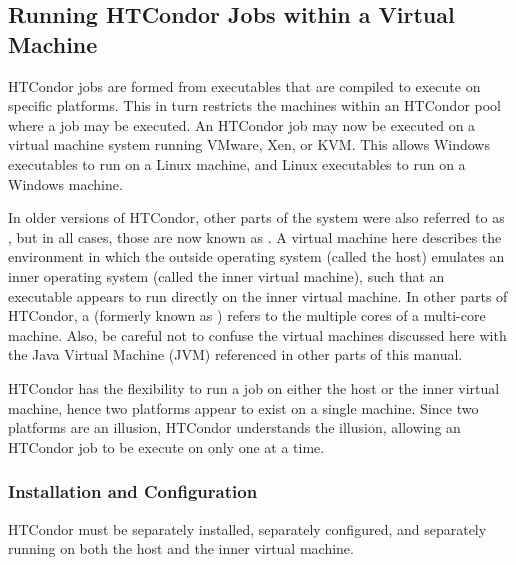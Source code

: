 \subsection{\label{sec:Virtual-Machines}
Running HTCondor Jobs within a Virtual Machine}

HTCondor jobs are formed from executables that are compiled to execute
on specific platforms.
This in turn restricts the machines within an HTCondor pool where
a job may be executed.
An HTCondor job may now be executed on a 
virtual machine system running VMware, Xen, or KVM.
This allows Windows executables to run on a Linux machine,
and Linux executables to run on a Windows machine.

In older versions of HTCondor, other parts of the system were also
referred to as , but in all cases, those are now
known as .
A virtual machine here describes the environment in which
the outside operating system (called the host) emulates an inner operating
system (called the inner virtual machine),
such that an executable appears to run directly
on the inner virtual machine.
In other parts of HTCondor, a  (formerly known as
) refers to the multiple cores of a multi-core
machine.
Also, be careful not to confuse the virtual machines discussed here
with the Java Virtual Machine (JVM) referenced in other parts of this
manual.

HTCondor has the flexibility to run a job on either the host
or the inner virtual machine, 
hence two platforms appear to exist on a single machine.
Since two platforms are an illusion, HTCondor understands the illusion, 
allowing an HTCondor job to be execute on only
one at a time.

\subsubsection{\label{sec:Virtual-Machines-Configuration}
Installation and Configuration}

HTCondor must be separately installed, separately configured,
and separately running on both
the host and the inner virtual machine.

